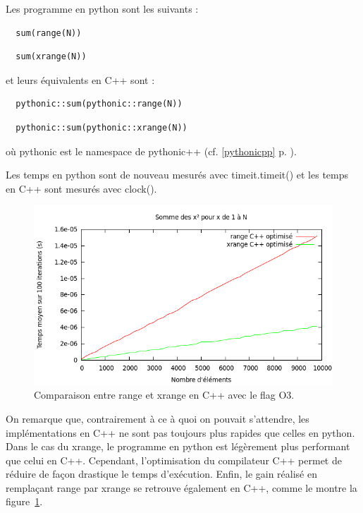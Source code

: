 \documentclass[a4paper]{article}
\begin{document}
Les programme en python sont les suivants :

\begin{verbatim}
  sum(range(N))
\end{verbatim}

\begin{verbatim}
  sum(xrange(N))
\end{verbatim}

et leurs équivalents en C++ sont :

\begin{verbatim}
  pythonic::sum(pythonic::range(N))
\end{verbatim}

\begin{verbatim}
  pythonic::sum(pythonic::xrange(N))
\end{verbatim}

où pythonic est le namespace de pythonic++ (cf. \ref{pythonicpp}
p. \pageref{pythonicpp}).

Les temps en python sont de nouveau mesurés avec timeit.timeit() et
les temps en C++ sont mesurés avec clock().

\begin{figure}[h]
  \includegraphics[scale=1]{./Pictures/RangeXrangeCppO3}
  \caption{Comparaison entre range et xrange en C++ avec le flag O3.}
  \label{RangeXrangeCppO3}
\end{figure}

On remarque que, contrairement à ce à quoi on pouvait s'attendre, les
implémentations en C++ ne sont pas toujours plus rapides que celles en
python. Dans le cas du xrange, le programme en python est légèrement
plus performant que celui en C++. Cependant, l'optimisation du
compilateur C++ permet de réduire de façon drastique le temps
d'exécution. Enfin, le gain réalisé en remplaçant range par xrange se
retrouve également en C++, comme le montre la
figure~\ref{RangeXrangeCppO3}.
\end{document}
